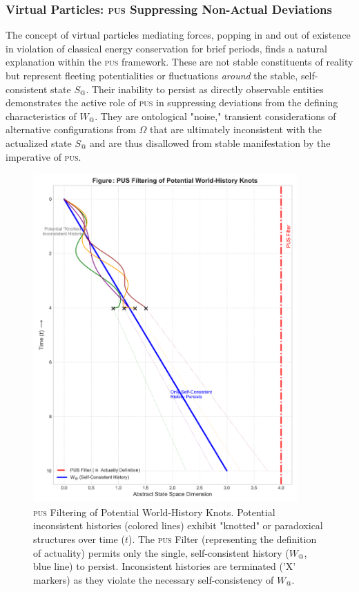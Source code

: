 \documentclass[11pt, a4paper]{article}
\makeatletter
\newcommand{\pus}{\textsc{pus}} %
\newcommand{\Wactual}{W_{@}} %
\newcommand{\Sactual}{S_{@}} %
\newcommand{\Omegaset}{\Omega} %
\makeatother
\begin{document}
\subsubsection{Virtual Particles: \pus{} Suppressing Non-Actual Deviations}
The concept of virtual particles mediating forces, popping in and out of existence in violation of classical energy conservation for brief periods, finds a natural explanation within the \pus{} framework. These are not stable constituents of reality but represent fleeting potentialities or fluctuations \textit{around} the stable, self-consistent state $\Sactual$. Their inability to persist as directly observable entities demonstrates the active role of \pus{} in suppressing deviations from the defining characteristics of $\Wactual$. They are ontological "noise," transient considerations of alternative configurations from $\Omegaset$ that are ultimately inconsistent with the actualized state $\Sactual$ and are thus disallowed from stable manifestation by the imperative of \pus.

\begin{figure}[htbp]
    \centering
    \includegraphics[width=0.9\textwidth]{figures/pus_figure3_knot_filter.png}
    \caption{\pus{} Filtering of Potential World-History Knots. Potential inconsistent histories (colored lines) exhibit "knotted" or paradoxical structures over time ($t$). The \pus{} Filter (representing the definition of actuality) permits only the single, self-consistent history ($\Wactual$, blue line) to persist. Inconsistent histories are terminated ('X' markers) as they violate the necessary self-consistency of $\Wactual$.}
    \label{fig:knots}
\end{figure}
\end{document}
